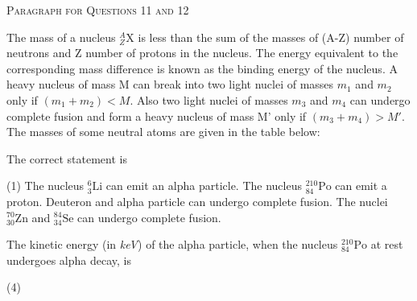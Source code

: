 \begin{center}
    \textsc{Paragraph for Questions 11 and 12}
\end{center}

The mass of a nucleus $^{A}_{Z}\mathrm{X}$ is less than the sum of the masses of (A-Z) number of neutrons and Z number of protons in the nucleus. The energy equivalent to the corresponding mass difference is known as the binding energy of the nucleus. A heavy nucleus of mass M can break into two light nuclei of masses $m_1$ and $m_2$ only if $(m_1+m_2) < M$. Also two light nuclei of masses $m_3$ and $m_4$ can undergo complete fusion and form a heavy nucleus of mass M' only if $(m_3+m_4) > M'$. The masses of some neutral atoms are given in the table below:


\item The correct statement is
    \begin{tasks}(1)
        \task The nucleus $^{6}_{3}\mathrm{Li}$ can emit an alpha particle.
        \task The nucleus $^{210}_{84}\mathrm{Po}$ can emit a proton.
        \task Deuteron and alpha particle can undergo complete fusion.
        \task The nuclei $^{70}_{30}\mathrm{Zn}$ and $^{84}_{34}\mathrm{Se}$ can undergo complete fusion.
    \end{tasks}
    

\item The kinetic energy (in \textit{keV}) of the alpha particle, when the nucleus $^{210}_{84}\mathrm{Po}$ at rest undergoes alpha decay, is
    \begin{tasks}(4)
    \end{tasks}
    